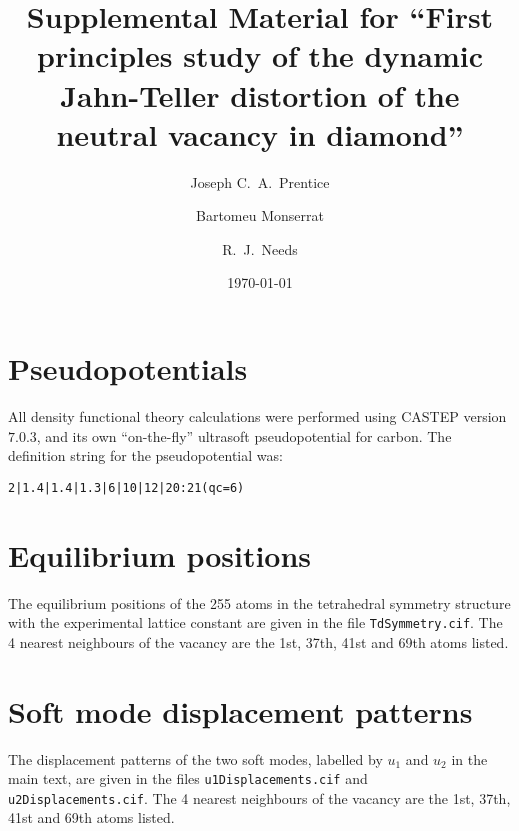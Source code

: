 \documentclass[aps,pra,onecolumn,superscriptaddress]{revtex4}
\begin{document}
\title{Supplemental Material for ``First principles study of the dynamic Jahn-Teller distortion of the neutral vacancy in diamond''}

\author{Joseph C.\ A.\ Prentice}
\author{Bartomeu Monserrat}
\author{R.\ J.\ Needs}


\date{\today}

\maketitle

\section{Pseudopotentials}

All density functional theory calculations were performed using {\sc CASTEP} version $7.0.3$, and its own ``on-the-fly'' ultrasoft pseudopotential for carbon. The definition string for the pseudopotential was:

\begin{verbatim}
2|1.4|1.4|1.3|6|10|12|20:21(qc=6)
\end{verbatim}

\section{Equilibrium positions}

The equilibrium positions of the 255 atoms in the tetrahedral symmetry structure with the experimental lattice constant are given in the file \texttt{TdSymmetry.cif}. The 4 nearest neighbours of the vacancy are the 1st, 37th, 41st and 69th atoms listed.

\section{Soft mode displacement patterns}

The displacement patterns of the two soft modes, labelled by $u_1$ and $u_2$ in the main text, are given in the files \texttt{u1Displacements.cif} and \texttt{u2Displacements.cif}. The 4 nearest neighbours of the vacancy are the 1st, 37th, 41st and 69th atoms listed. 
\end{document}
